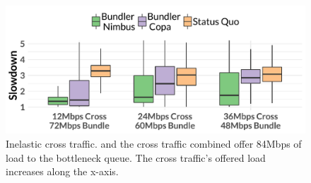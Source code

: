\begin{figure}
    \centering
\begin{knitrout}
\color{fgcolor}
\includegraphics[width=\maxwidth]{figure/robust:cr-inelastic-1} 

\end{knitrout}
    \caption{Inelastic cross traffic. \name and the cross traffic combined offer 84Mbps of load to the bottleneck queue. The cross traffic's offered load increases along the x-axis.}
    \label{fig:robust:cr-inelastic}
\end{figure}
